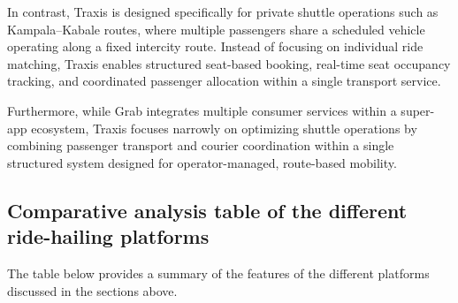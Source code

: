 In contrast, Traxis is designed specifically for private shuttle operations such
as Kampala–Kabale routes, where multiple passengers share a scheduled vehicle
operating along a fixed intercity route. Instead of focusing on individual ride
matching, Traxis enables structured seat-based booking, real-time seat occupancy
tracking, and coordinated passenger allocation within a single transport
service.


Furthermore, while Grab integrates multiple consumer services within a super-app
ecosystem, Traxis focuses narrowly on optimizing shuttle operations by combining
passenger transport and courier coordination within a single structured system
designed for operator-managed, route-based mobility.



\subsection{Comparative analysis table of the different ride-hailing platforms}
The table below provides a summary of the features of the different platforms
discussed in the sections above.

